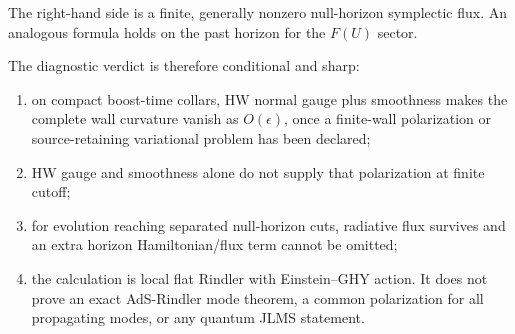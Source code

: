 The right-hand side is a finite, generally nonzero null-horizon symplectic flux. An analogous formula holds on the past horizon for the $F(U)$ sector.

The diagnostic verdict is therefore conditional and sharp:

\begin{enumerate}
\def\labelenumi{\arabic{enumi}.}
\tightlist
\item
  on compact boost-time collars, HW normal gauge plus smoothness makes the complete wall curvature vanish as $O(\epsilon)$, once a finite-wall polarization or source-retaining variational problem has been declared;
\item
  HW gauge and smoothness alone do not supply that polarization at finite cutoff;
\item
  for evolution reaching separated null-horizon cuts, radiative flux survives and an extra horizon Hamiltonian/flux term cannot be omitted;
\item
  the calculation is local flat Rindler with Einstein--GHY action. It does not prove an exact AdS-Rindler mode theorem, a common polarization for all propagating modes, or any quantum JLMS statement.
\end{enumerate}
